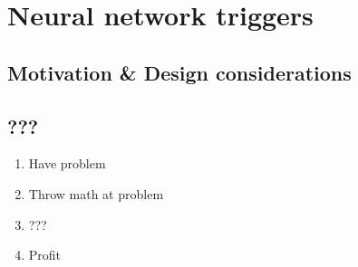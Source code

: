 
\chapter{Neural network triggers}
\label{chap:neural-network-triggers}

\section{Motivation \& Design considerations}
\label{sec:motivation}


\section{???}

\begin{enumerate}
    \item Have problem
    \item Throw math at problem
    \item ???
    \item Profit
\end{enumerate}

